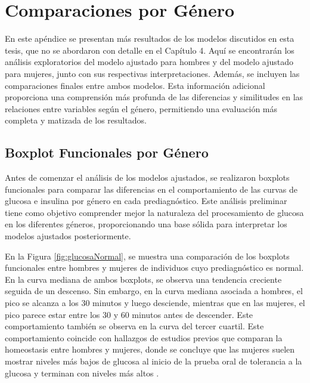 \appendix

\chapter{Comparaciones por Género}\label{ApendiceA}

En este apéndice se presentan más resultados de los modelos discutidos en esta tesis, que no se abordaron con detalle en el Capítulo 4. Aquí se encontrarán los análisis exploratorios del modelo ajustado para hombres y del modelo ajustado para mujeres, junto con sus respectivas interpretaciones. Además, se incluyen las comparaciones finales entre ambos modelos. Esta información adicional proporciona una comprensión más profunda de las diferencias y similitudes en las relaciones entre variables según el género, permitiendo una evaluación más completa y matizada de los resultados.


\section{Boxplot Funcionales por Género}

Antes de comenzar el análisis de los modelos ajustados, se realizaron boxplots funcionales para comparar las diferencias en el comportamiento de las curvas de glucosa e insulina por género en cada prediagnóstico. Este análisis preliminar tiene como objetivo comprender mejor la naturaleza del procesamiento de glucosa en los diferentes géneros, proporcionando una base sólida para interpretar los modelos ajustados posteriormente.

En la Figura \ref{fig:glucosaNormal}, se muestra una comparación de los boxplots funcionales entre hombres y mujeres de individuos cuyo prediagnóstico es normal. En la curva mediana de ambos boxplots, se observa una tendencia creciente seguida de un descenso. Sin embargo, en la curva mediana asociada a hombres, el pico se alcanza a los $30$ minutos y luego desciende, mientras que en las mujeres, el pico parece estar entre los $30$ y $60$ minutos antes de descender. Este comportamiento también se observa en la curva del tercer cuartil. Este comportamiento coincide con hallazgos de estudios previos que comparan la homeostasis entre hombres y mujeres, donde se concluye que las mujeres suelen mostrar niveles más bajos de glucosa al inicio de la prueba oral de tolerancia a la glucosa y terminan con niveles más altos \cite{GenderDifferences2018}.

